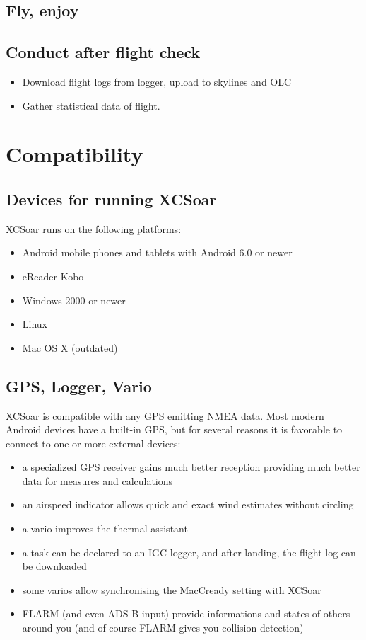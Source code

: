 \subsection*{Fly, enjoy}
\vspace{4em}

\subsection*{Conduct after flight check}
\begin{itemize}
\item Download flight logs from logger, upload to skylines and OLC
\item Gather statistical data of flight.
\end{itemize}
\newpage




\section{Compatibility}

\subsection*{Devices for running XCSoar}

XCSoar runs on the following platforms:

\begin{itemize}
\item Android mobile phones and tablets with Android 6.0 or newer 
\item eReader Kobo
\item Windows 2000 or newer
\item Linux
\item Mac OS X (outdated)
\end{itemize}

\subsection*{GPS, Logger, Vario}

XCSoar is compatible with any GPS emitting NMEA data.  Most modern
Android devices have a built-in GPS, but for several reasons it is favorable to
connect to one or more external devices:

\begin{itemize}
\item a specialized GPS receiver gains much better reception providing much 
better data for measures and calculations
\item an airspeed indicator allows quick and exact wind estimates
  without circling
\item a vario improves the thermal assistant
\item a task can be declared to an IGC logger, and after landing, the
  flight log can be downloaded
\item some varios allow synchronising the MacCready setting with
  XCSoar
\item FLARM (and even ADS-B input) provide informations and states of others
around you (and of course FLARM gives you collision detection)
\end{itemize}


